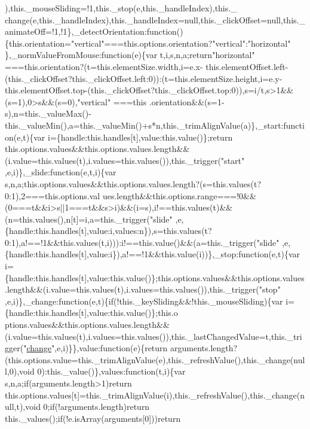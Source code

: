 \begin{DoxyCode}
{      ),this.\_mouseSliding=!1,this.\_stop(e,this.\_handleIndex),this.\_
      change(e,this.\_handleIndex),this.\_handleIndex=null,this.\_clickOffset=null,this.\_animateOff=!1,!1\},\_detectOrientation:function()\{this.orientation="}vertical\textcolor{stringliteral}{"===this.options.orientation?"}vertical\textcolor{stringliteral}{":"}horizontal\textcolor{stringliteral}{"
      \},\_normValueFromMouse:function(e)\{var t,i,s,n,a;return"}horizontal\textcolor{stringliteral}{"
      ===this.orientation?(t=this.elementSize.width,i=e.x-
      this.elementOffset.left-(this.\_clickOffset?this.\_clickOffset.left:0)):(t=this.elementSize.height,i=e.y-this.elementOffset.top-(this.\_clickOffset?this.\_clickOffset.top:0)),s=i/t,s>1&&(s=1),0>s&&(s=0),"}vertical\textcolor{stringliteral}{"
      ===this
      .orientation&&(s=1-s),n=this.\_valueMax()-this.\_valueMin(),a=this.\_valueMin()+s*n,this.\_trimAlignValue(a)\},\_start:function(e,t)\{var i=\{handle:this.handles[t],value:this.value()\};return
       this.options.values&&this.options.values.length&&(i.value=this.values(t),i.values=this.values()),this.\_trigger("}start\textcolor{stringliteral}{"
      ,e,i)\},\_slide:function(e,t,i)\{var
       s,n,a;this.options.values&&this.options.values.length?(s=this.values(t?0:1),2===this.options.val
      ues.length&&this.options.range===!0&&(0===t&&i>s||1===t&&s>i)&&(i=s),i!==this.values(t)&&(n=this.values(),n[t]=i,a=this.\_trigger("}slide\textcolor{stringliteral}{"
      ,e,\{handle:this.handles[t],value:i,values:n\}),s=this.values(t?0:1),a!==!1&&this.values(t,i))):i!==this.value()&&(a=this.\_trigger("}slide\textcolor{stringliteral}{"
      ,e,\{handle:this.handles[t],value:i\}),a!==!1&&this.value(i))\},\_stop:function(e,t)\{var
       i=\{handle:this.handles[t],value:this.value()\};this.options.values&&this.options.values.length&&(i.value=this.values(t),i.values=this.values()),this.\_trigger("}stop\textcolor{stringliteral}{"
      ,e,i)\},\_change:function(e,t)\{if(!this.\_keySliding&&!this.\_mouseSliding)\{var
       i=\{handle:this.handles[t],value:this.value()\};this.o
      ptions.values&&this.options.values.length&&(i.value=this.values(t),i.values=this.values()),this.\_lastChangedValue=t,this.\_trigger("}\hyperlink{period_type_select_8js_a13fd7c7324633c2bbcf51e83a3538bd4}{change}\textcolor{stringliteral}{",e,i)\}\},value:function(e)\{return
       arguments.length?(this.options.value=this.\_trimAlignValue(e),this.\_refreshValue(),this.\_change(null,0),void
       0):this.\_value()\},values:function(t,i)\{var s,n,a;if(arguments.length>1)return
       this.options.values[t]=this.\_trimAlignValue(i),this.\_refreshValue(),this.\_change(null,t),void 0;if(!arguments.length)return this.\_values();if(!e.isArray(arguments[0]))return
}
\end{DoxyCode}
